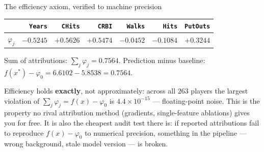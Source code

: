 \documentclass[aspectratio=169,11pt]{beamer}
\begin{document}
\begin{frame}{The efficiency axiom, verified to machine precision}
  \footnotesize
  \begin{numexample}
    \begin{center}
    \begin{tabular}{@{}lrrrrrr@{}}
      \toprule
      & \texttt{Years} & \texttt{CHits} & \texttt{CRBI} & \texttt{Walks} & \texttt{Hits} & \texttt{PutOuts} \\
      \midrule
      $\varphi_j$ & $-0.5245$ & $+0.5626$ & $+0.5474$ & $-0.0452$ & $-0.1084$ & $+0.3244$ \\
      \bottomrule
    \end{tabular}
    \end{center}
    Sum of attributions: $\sum_j \varphi_j = 0.7564$.\quad
    Prediction minus baseline: $f(x^\ast)-\varphi_0 = 6.6102-5.8538 = 0.7564$.
  \end{numexample}
  \begin{takeaway}
    Efficiency holds \textbf{exactly}, not approximately: across all $263$ players the
    largest violation of $\sum_j\varphi_j = f(x)-\varphi_0$ is $4.4\times10^{-15}$ ---
    floating-point noise. This is the property no rival attribution method
    (gradients, single-feature ablations) gives you for free. It is also the cheapest
    audit test there is: if reported attributions fail to reproduce $f(x)-\varphi_0$ to
    numerical precision, something in the pipeline --- wrong background, stale model
    version --- is broken.
  \end{takeaway}
\end{frame}
\end{document}
